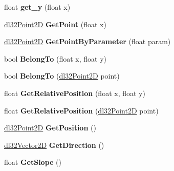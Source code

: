 \begin{DoxyCompactItemize}
\item 
\hypertarget{classdl32_line2_d_aa191af90762f74bd4d2490bc9a18334f}{float {\bfseries get\-\_\-y} (float x)}\label{classdl32_line2_d_aa191af90762f74bd4d2490bc9a18334f}

\item 
\hypertarget{classdl32_line2_d_aa4bf36c588a067025ade5cd4b3a27b3c}{\hyperlink{structdl32_point2_d}{dl32\-Point2\-D} {\bfseries Get\-Point} (float x)}\label{classdl32_line2_d_aa4bf36c588a067025ade5cd4b3a27b3c}

\item 
\hypertarget{classdl32_line2_d_a48699718e45d328645f553ad182adceb}{\hyperlink{structdl32_point2_d}{dl32\-Point2\-D} {\bfseries Get\-Point\-By\-Parameter} (float param)}\label{classdl32_line2_d_a48699718e45d328645f553ad182adceb}

\item 
\hypertarget{classdl32_line2_d_a279433fc79cb2d811e9cfeda9cff1cd1}{bool {\bfseries Belong\-To} (float x, float y)}\label{classdl32_line2_d_a279433fc79cb2d811e9cfeda9cff1cd1}

\item 
\hypertarget{classdl32_line2_d_a4c40a1619cede6619c3c122dea1dbe33}{bool {\bfseries Belong\-To} (\hyperlink{structdl32_point2_d}{dl32\-Point2\-D} point)}\label{classdl32_line2_d_a4c40a1619cede6619c3c122dea1dbe33}

\item 
\hypertarget{classdl32_line2_d_a65aec6b3b9435b91e61a26c0752446af}{float {\bfseries Get\-Relative\-Position} (float x, float y)}\label{classdl32_line2_d_a65aec6b3b9435b91e61a26c0752446af}

\item 
\hypertarget{classdl32_line2_d_a80d9291b4cdc0116ecd76e629337a0b3}{float {\bfseries Get\-Relative\-Position} (\hyperlink{structdl32_point2_d}{dl32\-Point2\-D} point)}\label{classdl32_line2_d_a80d9291b4cdc0116ecd76e629337a0b3}

\item 
\hypertarget{classdl32_line2_d_a98bf9412cbf6f41b3933a8a1fb4f85fd}{\hyperlink{structdl32_point2_d}{dl32\-Point2\-D} {\bfseries Get\-Position} ()}\label{classdl32_line2_d_a98bf9412cbf6f41b3933a8a1fb4f85fd}

\item 
\hypertarget{classdl32_line2_d_aa6df49ea787a4f093341e28a2cee2065}{\hyperlink{structdl32_vector2_d}{dl32\-Vector2\-D} {\bfseries Get\-Direction} ()}\label{classdl32_line2_d_aa6df49ea787a4f093341e28a2cee2065}

\item 
\hypertarget{classdl32_line2_d_ade4e8a66b8d20bc733dda7a20c3e80e0}{float {\bfseries Get\-Slope} ()}\label{classdl32_line2_d_ade4e8a66b8d20bc733dda7a20c3e80e0}


\end{DoxyCompactItemize}
